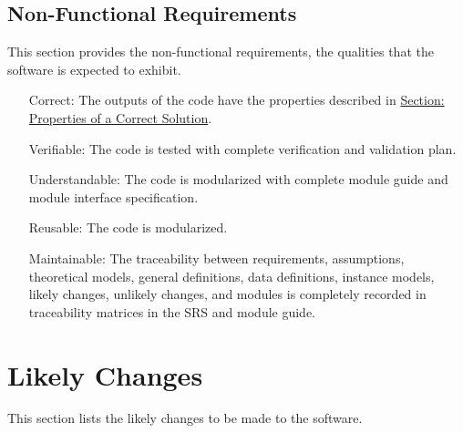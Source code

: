 \documentclass[12pt]{article}
\begin{document}
\subsection{Non-Functional Requirements}
\label{Sec:NFRs}
This section provides the non-functional requirements, the qualities that the software is expected to exhibit.

\begin{itemize}
\item[Correct:\phantomsection\label{correct}]{The outputs of the code have the properties described in \hyperref[Sec:CorSolProps]{Section: Properties of a Correct Solution}.}
\item[Verifiable:\phantomsection\label{verifiable}]{The code is tested with complete verification and validation plan.}
\item[Understandable:\phantomsection\label{understandable}]{The code is modularized with complete module guide and module interface specification.}
\item[Reusable:\phantomsection\label{reusable}]{The code is modularized.}
\item[Maintainable:\phantomsection\label{maintainable}]{The traceability between requirements, assumptions, theoretical models, general definitions, data definitions, instance models, likely changes, unlikely changes, and modules is completely recorded in traceability matrices in the SRS and module guide.}
\end{itemize}
\section{Likely Changes}
\label{Sec:LCs}
This section lists the likely changes to be made to the software.
\end{document}
